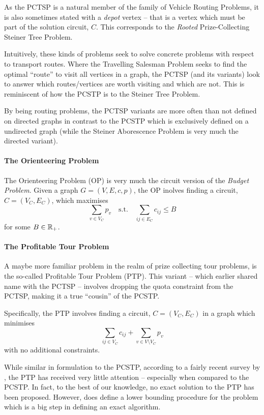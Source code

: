 As the PCTSP is a natural member of the family of Vehicle Routing Problems, it is also sometimes
stated with a \textit{depot} vertex \citep{feillet2005traveling} -- that is a vertex which
must be part of the solution circuit, $C$. This corresponds to the \textit{Rooted}
Prize-Collecting Steiner Tree Problem.

Intuitively, these kinds of problems seek to solve concrete problems with respect to transport routes.
Where the Travelling Salesman Problem seeks to find the optimal ``route'' to visit all vertices in
a graph, the PCTSP (and its variants) look to answer which routes/vertices are worth visiting and
which are not. This is reminiscent of how the PCSTP is to the Steiner Tree Problem.

By being routing problems, the PCTSP variants are more often than not defined on directed graphs in
contrast to the PCSTP which is exclusively defined on a undirected graph (while the Steiner Aborescence
 Problem is very much the directed variant).

\paragraph{The Orienteering Problem}
The Orienteering Problem (OP) is very much the circuit version of the \textit{Budget Problem}.
Given a graph $G  = (V, E, c, p)$, the OP inolves finding a circuit, $C = (V_C, E_C)$,
which maximises
$$\sum_{v \in V_C}  p_v \quad \text{s.t.} \quad \sum_{ij \in E_C} c_{ij} \leq B$$
for some $B \in \mathbb{R}_+$.

\paragraph{The Profitable Tour Problem}
A maybe more familiar problem in the realm of prize collecting tour problems, is the
so-called Profitable Tour Problem (PTP). This variant -- which earlier shared name with
the PCTSP -- involves dropping the quota constraint from the PCTSP, making it a true
 ``cousin'' of the PCSTP.

 Specifically, the PTP involves finding a circuit,
 $C = (V_C, E_C)$ in a graph which minimises
 $$\sum_{ij \in V_C} c_{ij} + \sum_{v \in V \setminus V_C} p_v$$
 with no additional constraints.
 
 While similar in formulation to the PCSTP, according to a fairly recent survey by
 \citet{archetti2014chapter}, the PTP has received very little attention -- 
 especially when compared to the PCSTP.
 In fact, to the best of our knowledge, no exact solution to the PTP
 has been proposed.
 However, \citet{dell1995prize} does define a lower bounding procedure for the problem
 which is a big step in defining an exact algorithm.
 
